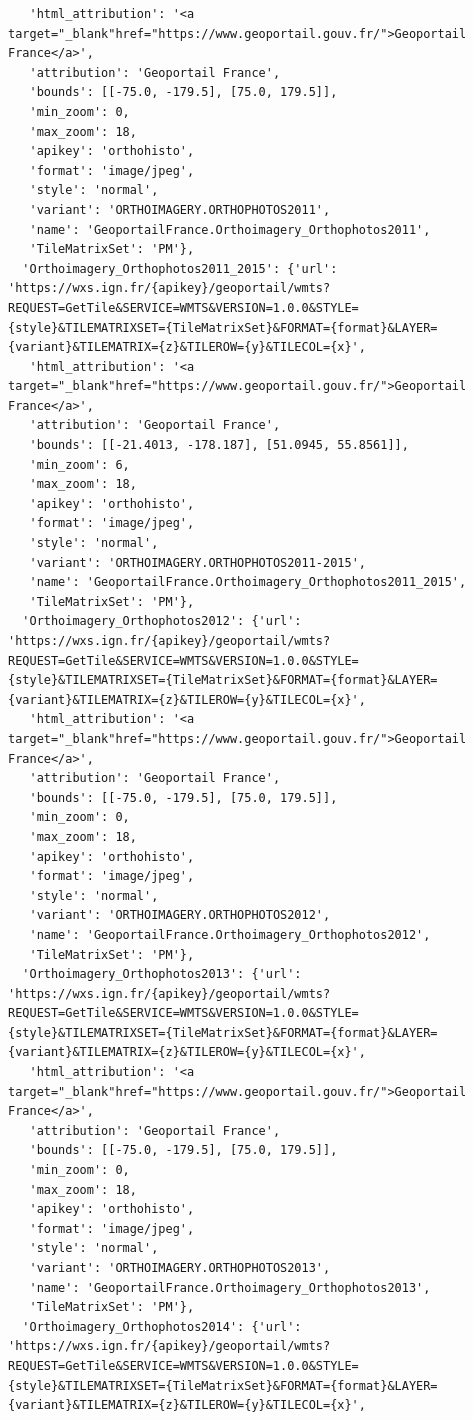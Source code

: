 \documentclass[
  letterpaper,
  DIV=11,
  numbers=noendperiod]{scrreprt}
\begin{document}
\begin{verbatim}
   'html_attribution': '<a target="_blank"href="https://www.geoportail.gouv.fr/">Geoportail France</a>',
   'attribution': 'Geoportail France',
   'bounds': [[-75.0, -179.5], [75.0, 179.5]],
   'min_zoom': 0,
   'max_zoom': 18,
   'apikey': 'orthohisto',
   'format': 'image/jpeg',
   'style': 'normal',
   'variant': 'ORTHOIMAGERY.ORTHOPHOTOS2011',
   'name': 'GeoportailFrance.Orthoimagery_Orthophotos2011',
   'TileMatrixSet': 'PM'},
  'Orthoimagery_Orthophotos2011_2015': {'url': 'https://wxs.ign.fr/{apikey}/geoportail/wmts?REQUEST=GetTile&SERVICE=WMTS&VERSION=1.0.0&STYLE={style}&TILEMATRIXSET={TileMatrixSet}&FORMAT={format}&LAYER={variant}&TILEMATRIX={z}&TILEROW={y}&TILECOL={x}',
   'html_attribution': '<a target="_blank"href="https://www.geoportail.gouv.fr/">Geoportail France</a>',
   'attribution': 'Geoportail France',
   'bounds': [[-21.4013, -178.187], [51.0945, 55.8561]],
   'min_zoom': 6,
   'max_zoom': 18,
   'apikey': 'orthohisto',
   'format': 'image/jpeg',
   'style': 'normal',
   'variant': 'ORTHOIMAGERY.ORTHOPHOTOS2011-2015',
   'name': 'GeoportailFrance.Orthoimagery_Orthophotos2011_2015',
   'TileMatrixSet': 'PM'},
  'Orthoimagery_Orthophotos2012': {'url': 'https://wxs.ign.fr/{apikey}/geoportail/wmts?REQUEST=GetTile&SERVICE=WMTS&VERSION=1.0.0&STYLE={style}&TILEMATRIXSET={TileMatrixSet}&FORMAT={format}&LAYER={variant}&TILEMATRIX={z}&TILEROW={y}&TILECOL={x}',
   'html_attribution': '<a target="_blank"href="https://www.geoportail.gouv.fr/">Geoportail France</a>',
   'attribution': 'Geoportail France',
   'bounds': [[-75.0, -179.5], [75.0, 179.5]],
   'min_zoom': 0,
   'max_zoom': 18,
   'apikey': 'orthohisto',
   'format': 'image/jpeg',
   'style': 'normal',
   'variant': 'ORTHOIMAGERY.ORTHOPHOTOS2012',
   'name': 'GeoportailFrance.Orthoimagery_Orthophotos2012',
   'TileMatrixSet': 'PM'},
  'Orthoimagery_Orthophotos2013': {'url': 'https://wxs.ign.fr/{apikey}/geoportail/wmts?REQUEST=GetTile&SERVICE=WMTS&VERSION=1.0.0&STYLE={style}&TILEMATRIXSET={TileMatrixSet}&FORMAT={format}&LAYER={variant}&TILEMATRIX={z}&TILEROW={y}&TILECOL={x}',
   'html_attribution': '<a target="_blank"href="https://www.geoportail.gouv.fr/">Geoportail France</a>',
   'attribution': 'Geoportail France',
   'bounds': [[-75.0, -179.5], [75.0, 179.5]],
   'min_zoom': 0,
   'max_zoom': 18,
   'apikey': 'orthohisto',
   'format': 'image/jpeg',
   'style': 'normal',
   'variant': 'ORTHOIMAGERY.ORTHOPHOTOS2013',
   'name': 'GeoportailFrance.Orthoimagery_Orthophotos2013',
   'TileMatrixSet': 'PM'},
  'Orthoimagery_Orthophotos2014': {'url': 'https://wxs.ign.fr/{apikey}/geoportail/wmts?REQUEST=GetTile&SERVICE=WMTS&VERSION=1.0.0&STYLE={style}&TILEMATRIXSET={TileMatrixSet}&FORMAT={format}&LAYER={variant}&TILEMATRIX={z}&TILEROW={y}&TILECOL={x}',

\end{verbatim}
\end{document}
